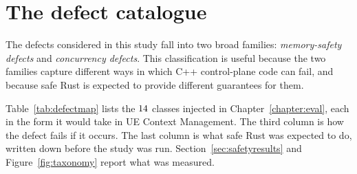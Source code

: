 \documentclass[english,oneside,a4paper,censored,csm,software-track-2020]{HYthesisML}
\begin{document}
\section{The defect catalogue}\label{sec:defects}
The defects considered in this study fall into two broad families:
\emph{memory-safety defects} and \emph{concurrency defects}. This
classification is useful because the two families capture different ways in
which C++ control-plane code can fail, and because safe Rust is expected to
provide different guarantees for them.

Table~\ref{tab:defectmap} lists the $14$ classes injected in
Chapter~\ref{chapter:eval}, each in the form it would take in UE Context
Management. The third column is how the defect fails if it occurs. The last
column is what safe Rust was expected to do, written down before the study was run.
Section~\ref{sec:safetyresults} and Figure~\ref{fig:taxonomy} report what was
measured.
\end{document}

